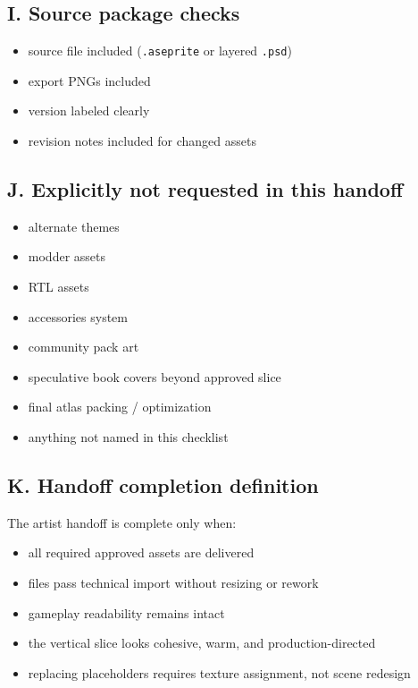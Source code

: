 \documentclass[11pt,a4paper]{article}
\newcommand{\checkbox}{\ensuremath{\square}}
\begin{document}
\subsection*{I. Source package checks}
\begin{itemize}
  \item[\checkbox] source file included (\texttt{.aseprite} or layered \texttt{.psd})
  \item[\checkbox] export PNGs included
  \item[\checkbox] version labeled clearly
  \item[\checkbox] revision notes included for changed assets
\end{itemize}

\subsection*{J. Explicitly not requested in this handoff}
\begin{itemize}
  \item[\checkbox] alternate themes
  \item[\checkbox] modder assets
  \item[\checkbox] RTL assets
  \item[\checkbox] accessories system
  \item[\checkbox] community pack art
  \item[\checkbox] speculative book covers beyond approved slice
  \item[\checkbox] final atlas packing / optimization
  \item[\checkbox] anything not named in this checklist
\end{itemize}

\subsection*{K. Handoff completion definition}
The artist handoff is complete only when:
\begin{itemize}
  \item[\checkbox] all required approved assets are delivered
  \item[\checkbox] files pass technical import without resizing or rework
  \item[\checkbox] gameplay readability remains intact
  \item[\checkbox] the vertical slice looks cohesive, warm, and production-directed
  \item[\checkbox] replacing placeholders requires texture assignment, not scene redesign
\end{itemize}
\end{document}
